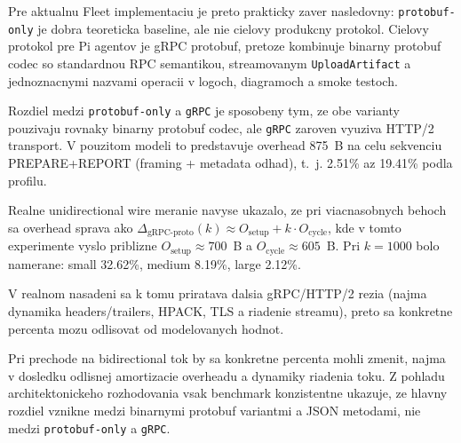 \documentclass[12pt,a4paper]{report}
\begin{document}
Pre aktualnu Fleet implementaciu je preto prakticky zaver nasledovny:
\texttt{protobuf-only} je dobra teoreticka baseline, ale nie cielovy
produkcny protokol. Cielovy protokol pre Pi agentov je gRPC protobuf,
pretoze kombinuje binarny protobuf codec so standardnou RPC semantikou,
streamovanym \texttt{UploadArtifact} a jednoznacnymi nazvami operacii
v logoch, diagramoch a smoke testoch.

Rozdiel medzi \texttt{protobuf-only} a \texttt{gRPC} je sposobeny tym,
ze obe varianty pouzivaju rovnaky binarny protobuf codec, ale \texttt{gRPC}
zaroven vyuziva HTTP/2 transport. V pouzitom modeli to predstavuje overhead
875~B na celu sekvenciu PREPARE+REPORT (framing + metadata odhad),
t.~j. 2.51\% az 19.41\% podla profilu.

Realne unidirectional wire meranie navyse ukazalo, ze pri viacnasobnych behoch
sa overhead sprava ako
$\Delta_{\text{gRPC-proto}}(k) \approx O_{\text{setup}} + k\cdot O_{\text{cycle}}$,
kde v tomto experimente vyslo priblizne
$O_{\text{setup}}\approx700$~B a $O_{\text{cycle}}\approx605$~B.
Pri $k=1000$ bolo namerane:
small 32.62\%, medium 8.19\%, large 2.12\%.

V realnom nasadeni sa k tomu priratava dalsia gRPC/HTTP/2 rezia
(najma dynamika headers/trailers, HPACK, TLS a riadenie streamu), preto sa
konkretne percenta mozu odlisovat od modelovanych hodnot.

Pri prechode na bidirectional tok by sa konkretne percenta mohli zmenit,
najma v dosledku odlisnej amortizacie overheadu a dynamiky riadenia toku.
Z pohladu architektonickeho rozhodovania vsak benchmark konzistentne ukazuje,
ze hlavny rozdiel vznikne medzi binarnymi protobuf variantmi a JSON metodami,
nie medzi \texttt{protobuf-only} a \texttt{gRPC}.
\end{document}

